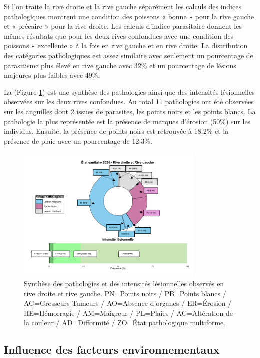 \documentclass[11pt,titlepage,twoside]{article}\usepackage[]{graphicx}\usepackage[table]{xcolor}
\begin{document}
Si l’on traite la rive droite et la rive gauche séparément les calculs des indices pathologiques montrent une condition des poissons « bonne » pour la rive gauche et « précaire » pour la rive droite. Les calculs d’indice parasitaire donnent les mêmes résultats que pour les deux rives confondues avec une condition des poissons « excellente » à la fois en rive gauche et en rive droite. La distribution des catégories pathologiques est assez similaire avec seulement un pourcentage de parasitisme plus élevé en rive gauche avec 32\% et un pourcentage de lésions majeures plus faibles avec 49\%. 

La (Figure \ref{patho}) est une synthèse des pathologies ainsi que des intensités lésionnelles observées sur les deux rives confondues. Au total 11 pathologies ont été observées sur les anguilles dont 2 issues de parasites, les points noirs et les points blancs. La pathologie la plus représentée est la présence de marques d’érosion (50\%) sur les individus. Ensuite, la présence de points noirs est retrouvée à 18.2\% et la présence de plaie avec un pourcentage de 12.3\%.

\begin{figure}[htpb]
\centering
\includegraphics[width=0.8\textwidth]{patho.png}
\caption{Synthèse des pathologies et des intensités lésionnelles observés en rive droite et rive gauche. PN=Points noirs / PB=Points blancs / AG=Grosseurs-Tumeurs / AO=Absence d’organes / ER=Érosion / HE=Hémorragie / AM=Maigreur / PL=Plaies / AC=Altération de la couleur / AD=Difformité / ZO=État pathologique multiforme.}
\label{patho}
\end{figure} 


\subsection{Influence des facteurs environnementaux }
\end{document}

